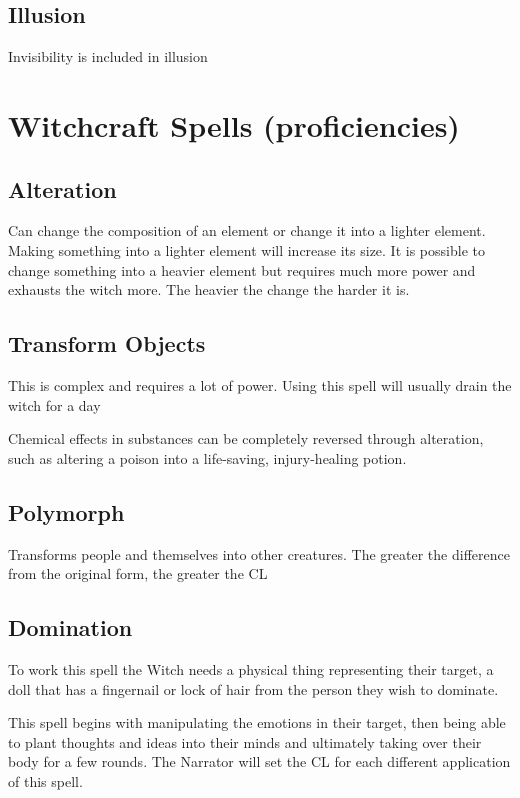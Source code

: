 \subsection{Illusion}

Invisibility is included in illusion

\section{Witchcraft Spells (proficiencies)}

\subsection{Alteration}

Can change the composition of an element or change it into a lighter element. Making something into a lighter element will increase its size. It is possible to change something into a heavier element but requires much more power and exhausts the witch more. The heavier the change the harder it is.

\subsection{Transform Objects}

This is complex and requires a lot of power. Using this spell will usually drain the witch for a day

Chemical effects in substances can be completely reversed through alteration, such as altering a poison into a life-saving, injury-healing potion.

\subsection{Polymorph}

Transforms people and themselves into other creatures. The greater the difference from the original form, the greater the CL

\subsection{Domination}

To work this spell the Witch needs a physical thing representing their target, a doll that has a fingernail or lock of hair from the person they wish to dominate.

This spell begins with manipulating the emotions in their target, then being able to plant thoughts and ideas into their minds and ultimately taking over their body for a few rounds. The Narrator will set the CL for each different application of this spell.

